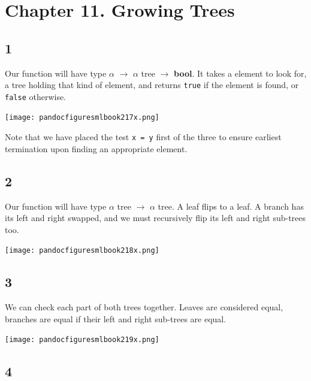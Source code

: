 \documentclass[]{book}
\begin{document}
\section*{Chapter 11. Growing Trees}

\subsection*{1}
Our function will have type \textsf{$\alpha$ $\rightarrow$ $\alpha$ tree $\rightarrow$ \textbf{bool}}. It takes a element to look for, a tree holding that kind of element, and returns \texttt{true} if the element is found, or \texttt{false} otherwise.

\medskip
\begin{center}
\noindent\texttt{[image: pandocfiguresmlbook217x.png]}
\end{center}
\medskip

\noindent Note that we have placed the test \texttt{x = y} first of the three to ensure earliest termination upon finding an appropriate element.

\subsection*{2}

Our function will have type \textsf{$\alpha$ tree $\rightarrow$ $\alpha$ tree}. A leaf flips to a leaf. A branch has its left and right swapped, and we must recursively flip its left and right sub-trees too.

\medskip
\begin{center}
\noindent\texttt{[image: pandocfiguresmlbook218x.png]}
\end{center}
\medskip

\subsection*{3}

We can check each part of both trees together. Leaves are considered equal, branches are equal if their left and right sub-trees are equal.

\medskip
\begin{center}
\noindent\texttt{[image: pandocfiguresmlbook219x.png]}
\end{center}
\medskip

\subsection*{4}
\end{document}

